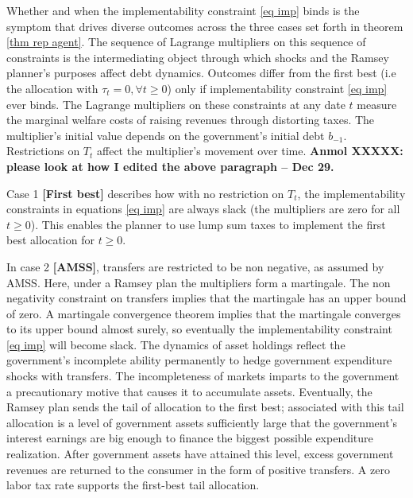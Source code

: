 \documentclass[thmsb,11pt]{article}
\begin{document}
Whether  and when the implementability constraint \eqref{eq imp}  binds  is the symptom  that drives  diverse outcomes across  the three cases
 set forth in theorem  \ref{thm rep agent}.  The sequence of Lagrange multipliers on this sequence of  constraints is the intermediating object through which
shocks and the Ramsey planner's purposes  affect  debt dynamics.  Outcomes  differ from the first best (i.e the allocation with $\tau_t=0, \forall t\geq0$) only if  implementability constraint  \eqref{eq imp} ever binds. The Lagrange multipliers on these constraints at any date $t$ measure
    the marginal welfare costs of raising revenues through distorting taxes.  The multiplier's initial value depends on the government's initial debt
     $b_{-1}$.  Restrictions on  $T_t$ affect the  multiplier's  movement over time. 
     \textbf{Anmol XXXXX: please look at how I edited the above paragraph -- Dec 29.}

Case 1 \textbf{[First best]} describes how with no restriction on $T_t$, the implementability  constraints in equations \eqref{eq imp} are  always slack (the multipliers are zero for all $t\geq 0$). This enables  the  planner  to use lump sum taxes
 to implement the first best allocation for $t \geq 0$.

In case 2 \textbf{[AMSS]},  transfers are restricted  to be non negative, as assumed by AMSS. Here, under a Ramsey plan the multipliers
 form a  martingale. The non negativity constraint on transfers implies that the martingale has an upper bound of zero.
  A martingale convergence theorem implies  that the martingale converges to its upper bound almost surely, so   eventually the  implementability constraint \eqref{eq imp} will become  slack. The dynamics of asset holdings reflect  the government's
   incomplete ability permanently to hedge government expenditure shocks with transfers. The incompleteness of markets imparts to the government  a precautionary motive that causes it to  accumulate assets. Eventually, the Ramsey plan sends the tail of allocation to  the first best; associated with this tail allocation
    is a level of government assets sufficiently large that  the government's interest earnings are big enough to finance the biggest possible expenditure realization. After government assets have attained this level, excess government revenues  are returned to the consumer in the form of  positive transfers. A zero labor tax rate supports the first-best tail allocation.
\end{document}
